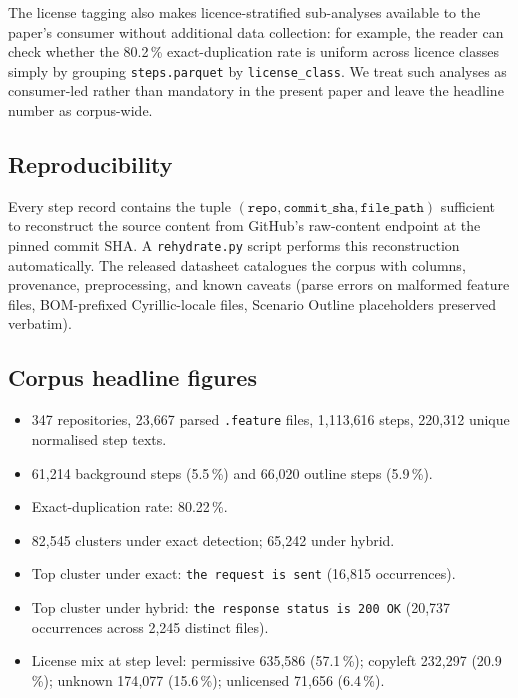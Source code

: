 \documentclass[11pt,a4paper]{article}
\begin{document}
The license tagging also makes licence-stratified sub-analyses
available to the paper's consumer without additional data
collection: for example, the reader can check whether the 80.2\,\%
exact-duplication rate is uniform across licence classes simply
by grouping \texttt{steps.parquet} by \texttt{license\_class}. We
treat such analyses as consumer-led rather than mandatory in the
present paper and leave the headline number as corpus-wide.

\subsection{Reproducibility}

Every step record contains the tuple \((\texttt{repo},
\texttt{commit\_sha}, \texttt{file\_path})\) sufficient to reconstruct
the source content from GitHub's raw-content endpoint at the pinned
commit SHA. A \texttt{rehydrate.py} script performs this reconstruction
automatically. The released datasheet \citep{gebru2021datasheets}
catalogues the corpus with columns, provenance, preprocessing, and
known caveats (parse errors on malformed feature files, BOM-prefixed
Cyrillic-locale files, Scenario Outline placeholders preserved
verbatim).

\subsection{Corpus headline figures}

\begin{itemize}[leftmargin=2em]
\item 347 repositories, 23{,}667 parsed \texttt{.feature} files, 1{,}113{,}616
      steps, 220{,}312 unique normalised step texts.
\item 61{,}214 background steps (5.5\,\%) and 66{,}020 outline steps
      (5.9\,\%).
\item Exact-duplication rate: 80.22\,\%.
\item 82{,}545 clusters under exact detection; 65{,}242 under hybrid.
\item Top cluster under exact: \texttt{the request is sent}
      (16{,}815 occurrences).
\item Top cluster under hybrid: \texttt{the response status is 200 OK}
      (20{,}737 occurrences across 2{,}245 distinct files).
\item License mix at step level:
      permissive 635{,}586 (57.1\,\%);
      copyleft 232{,}297 (20.9\,\%);
      unknown 174{,}077 (15.6\,\%);
      unlicensed 71{,}656 (6.4\,\%).
\end{itemize}
\end{document}
